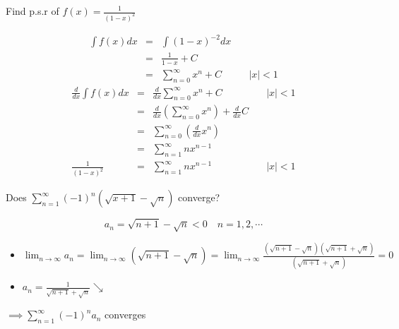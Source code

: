 \begin{eg}
Find p.s.r of \(\displaystyle f(x) = \frac{1}{(1 - x)^2}\)

\soln
\[\begin{array}{lcll}
\displaystyle \int f(x) dx & = & \displaystyle \int ( 1-x)^{-2} dx\\
& = & \displaystyle \frac{1}{1 - x} + C\\
& = & \displaystyle \sum^{\infty}_{n = 0} x^n + C & \quad |x| < 1
\end{array}\]
\[\begin{array}{lcll}
\displaystyle \frac{d}{dx} \int f(x) dx & = & \displaystyle \frac{d}{dx} \sum^{\infty}_{n = 0} x^n + C & \quad |x| < 1\\
& = & \displaystyle \frac{d}{dx} (\sum^{\infty}_{n = 0} x^n) + \frac{d}{dx} C\\
& = & \displaystyle \sum^{\infty}_{n = 0} (\frac{d}{dx} x^n)\\
& = & \displaystyle \sum^{\infty}_{n = 1} nx^{n - 1}\\
\displaystyle \frac{1}{(1 - x)^2} & = & \displaystyle \sum^{\infty}_{n = 1} nx^{n - 1} & \quad |x| < 1
\end{array}\]
\end{eg}
\begin{eg}
Does \(\displaystyle \sum^{\infty}_{n = 1} (-1)^n (\sqrt{x + 1} - \sqrt{n})\) converge?

\soln
\[\displaystyle a_n = \sqrt{n + 1} - \sqrt{n} < 0 \quad n = 1, 2, \cdots\]
\begin{itemize}
\item \(\displaystyle \lim_{n \to \infty} a_n = \lim_{n \to \infty} (\sqrt{n + 1} - \sqrt{n}) = \lim_{n \to \infty} \frac{(\sqrt{n + 1} - \sqrt{n})(\sqrt{n + 1} + \sqrt{n})}{(\sqrt{n + 1} + \sqrt{n})} = 0\)
\item \(\displaystyle a_n = \frac{1}{\sqrt{n + 1} + \sqrt{n}} \searrow\)
\end{itemize}
\(\implies \displaystyle \sum^{\infty}_{n = 1} ( -1)^n a_n\) converges
\end{eg}
